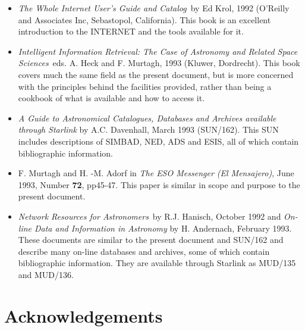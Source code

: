 \documentclass[twoside,11pt]{article}
\newcommand{\xref}[3]{#1}
\newcommand{\xlabel}[1]{}
\begin{document}
\begin{itemize}

  \item {\it The Whole Internet User's Guide and
   Catalog}\, by Ed Krol, 1992 (O'Reilly and Associates Inc, 
   Sebastopol, California). This book is an excellent introduction to
   the INTERNET and the tools available for it.

  \item {\it Intelligent Information Retrieval: The Case of Astronomy
   and Related Space Sciences}\, eds. A. Heck and F. Murtagh, 1993
   (Kluwer, Dordrecht). This book covers much the same field as the 
   present document, but is more concerned with the principles behind
   the facilities provided, rather than being a cookbook of what is
   available and how to access it.

  \item {\it A Guide to Astronomical Catalogues, Databases and Archives
   available through Starlink} by A.C. Davenhall, March 1993
   (\xref{SUN/162}{sun162}{}).
   This SUN includes descriptions of SIMBAD, NED, ADS and ESIS, all of 
   which contain bibliographic information.

  \item F. Murtagh and H. -M. Adorf in {\it The ESO Messenger (El 
   Mensajero)}, June 1993, Number {\bf 72}, pp45-47. This paper is
   similar in scope and purpose to the present document.

  \item {\it Network Resources for Astronomers}\, by R.J. Hanisch, 
   October 1992 and {\it On-line Data and Information in Astronomy} 
   by H. Andernach, February 1993. These documents are similar to the
   present document and \xref{SUN/162}{sun162}{} and describe many on-line
   databases and 
   archives, some of which contain bibliographic information. They are 
   available through Starlink as MUD/135 and MUD/136.

\end{itemize}


\section{Acknowledgements\xlabel{acknowledgements}}
\end{document}
